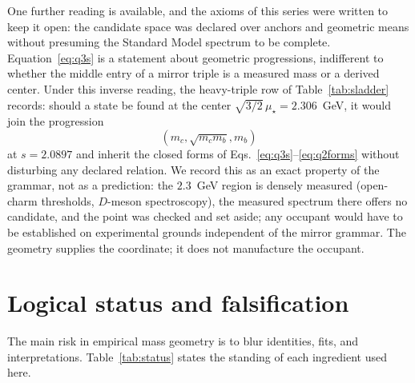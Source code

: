 \documentclass[aps,twocolumn,superscriptaddress,nofootinbib,floatfix]{revtex4-2}
\newcommand{\mstar}{\mu_\star}
\begin{document}
One further reading is available, and the axioms of this series were written to keep it open: the candidate space was declared over anchors and geometric means without presuming the Standard Model spectrum to be complete. Equation~\eqref{eq:q3s} is a statement about geometric progressions, indifferent to whether the middle entry of a mirror triple is a measured mass or a derived center. Under this inverse reading, the heavy-triple row of Table~\ref{tab:sladder} records: should a state be found at the center $\sqrt{3/2}\,\mstar=2.306$~GeV, it would join the progression $$(m_c,\sqrt{m_cm_b},m_b)$$ at $s=2.0897$ and inherit the closed forms of Eqs.~\eqref{eq:q3s}--\eqref{eq:q2forms} without disturbing any declared relation. We record this as an exact property of the grammar, not as a prediction: the $2.3$~GeV region is densely measured (open-charm thresholds, $D$-meson spectroscopy), the measured spectrum there offers no candidate, and the point was checked and set aside; any occupant would have to be established on experimental grounds independent of the mirror grammar. The geometry supplies the coordinate; it does not manufacture the occupant.

\section{Logical status and falsification}

The main risk in empirical mass geometry is to blur identities, fits, and interpretations. Table~\ref{tab:status} states the standing of each ingredient used here.
\end{document}
